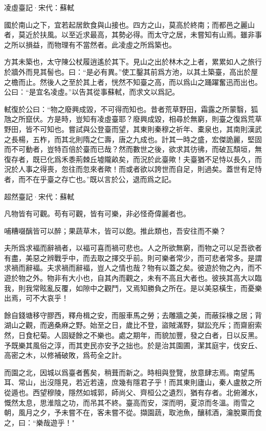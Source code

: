 \documentclass[12pt,a4paper]{ctexbook}
\begin{document}
凌虛臺記·宋代：蘇軾 \par
國於南山之下，宜若起居飲食與山接也。四方之山，莫高於終南；而都邑之麗山者，莫近於扶風。以至近求最高，其勢必得。而太守之居，未嘗知有山焉。雖非事之所以損益，而物理有不當然者。此凌虛之所爲築也。\par
方其未築也，太守陳公杖履逍遙於其下。見山之出於林木之上者，累累如人之旅行於牆外而見其髻也。曰：“是必有異。”使工鑿其前爲方池，以其土築臺，高出於屋之檐而止。然後人之至於其上者，恍然不知臺之高，而以爲山之踊躍奮迅而出也。公曰：“是宜名凌虛。”以告其從事蘇軾，而求文以爲記。\par
軾復於公曰：“物之廢興成毀，不可得而知也。昔者荒草野田，霜露之所蒙翳，狐虺之所竄伏。方是時，豈知有凌虛臺耶？廢興成毀，相尋於無窮，則臺之復爲荒草野田，皆不可知也。嘗試與公登臺而望，其東則秦穆之祈年、橐泉也，其南則漢武之長楊，五柞，而其北則隋之仁壽，唐之九成也。計其一時之盛，宏傑詭麗，堅固而不可動者，豈特百倍於臺而已哉？然而數世之後，欲求其彷彿，而破瓦頹垣，無復存者，既已化爲禾黍荊棘丘墟隴畝矣，而況於此臺歟！夫臺猶不足恃以長久，而況於人事之得喪，忽往而忽來者歟！而或者欲以誇世而自足，則過矣。蓋世有足恃者，而不在乎臺之存亡也。”既以言於公，退而爲之記。\par
超然臺記·宋代：蘇軾 \par
凡物皆有可觀。苟有可觀，皆有可樂，非必怪奇偉麗者也。\par
哺糟啜醨皆可以醉；果蔬草木，皆可以飽。推此類也，吾安往而不樂？\par
夫所爲求褔而辭禍者，以褔可喜而禍可悲也。人之所欲無窮，而物之可以足吾欲者有盡，美惡之辨戰乎中，而去取之擇交乎前。則可樂者常少，而可悲者常多。是謂求禍而辭褔。夫求禍而辭褔，豈人之情也哉？物有以蓋之矣。彼遊於物之內，而不遊於物之外。物非有大小也，自其內而觀之，未有不高且大者也。彼挾其高大以臨我，則我常眩亂反覆，如隙中之觀鬥，又焉知勝負之所在。是以美惡橫生，而憂樂出焉，可不大哀乎！\par
餘自錢塘移守膠西，釋舟楫之安，而服車馬之勞；去雕牆之美，而蔽採椽之居；背湖山之觀，而適桑麻之野。始至之日，歲比不登，盜賊滿野，獄訟充斥；而齋廚索然，日食杞菊。人固疑餘之不樂也。處之期年，而貌加豐，發之白者，日以反黑。予既樂其風俗之淳，而其吏民亦安予之拙也。於是治其園圃，潔其庭宇，伐安丘、高密之木，以修補破敗，爲苟全之計。\par
而園之北，因城以爲臺者舊矣，稍葺而新之。時相與登覽，放意肆志焉。南望馬耳、常山，出沒隱見，若近若遠，庶幾有隱君子乎！而其東則廬山，秦人盧敖之所從遁也。西望穆陵，隱然如城郭，師尚父、齊桓公之遺烈，猶有存者。北俯濰水，慨然太息，思淮陰之功，而吊其不終。臺高而安，深而明，夏涼而冬溫。雨雪之朝，風月之夕，予未嘗不在，客未嘗不從。擷園蔬，取池魚，釀秫酒，瀹脫粟而食之，曰：“樂哉遊乎！"\par
\end{document}
